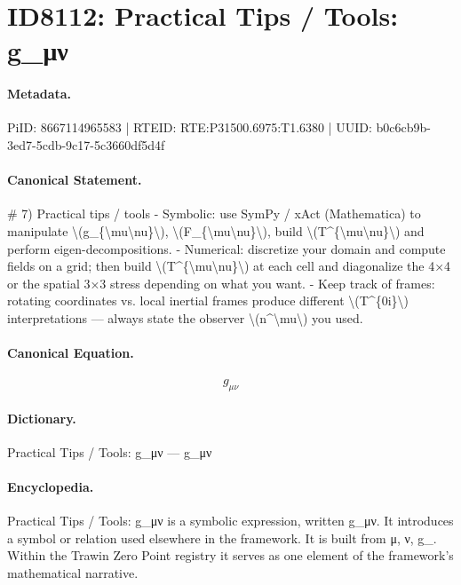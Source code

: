 \section*{ID8112: Practical Tips / Tools: g\_μν}
\paragraph{Metadata.}
PiID: 8667114965583 | RTEID: RTE:P31500.6975:T1.6380 | UUID: b0c6cb9b-3ed7-5cdb-9c17-5c3660df5d4f

\paragraph{Canonical Statement.}
\# 7) Practical tips / tools - Symbolic: use SymPy / xAct (Mathematica) to manipulate \textbackslash{}(g\_\{\textbackslash{}mu\textbackslash{}nu\}\textbackslash{}), \textbackslash{}(F\_\{\textbackslash{}mu\textbackslash{}nu\}\textbackslash{}), build \textbackslash{}(T\textasciicircum{}\{\textbackslash{}mu\textbackslash{}nu\}\textbackslash{}) and perform eigen-decompositions. - Numerical: discretize your domain and compute fields on a grid; then build \textbackslash{}(T\textasciicircum{}\{\textbackslash{}mu\textbackslash{}nu\}\textbackslash{}) at each cell and diagonalize the 4×4 or the spatial 3×3 stress depending on what you want. - Keep track of frames: rotating coordinates vs. local inertial frames produce different \textbackslash{}(T\textasciicircum{}\{0i\}\textbackslash{}) interpretations — always state the observer \textbackslash{}(n\textasciicircum{}\textbackslash{}mu\textbackslash{}) you used.

\paragraph{Canonical Equation.}
\[
g_{\mu\nu}
\]

\paragraph{Dictionary.}
Practical Tips / Tools: g\_μν — g\_μν

\paragraph{Encyclopedia.}
Practical Tips / Tools: g\_μν is a symbolic expression, written g\_μν. It introduces a symbol or relation used elsewhere in the framework. It is built from μ, ν, g\_. Within the Trawin Zero Point registry it serves as one element of the framework's mathematical narrative.
